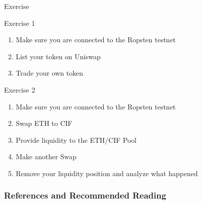 \documentclass[]{beamer}
\begin{document}
\begin{frame}{Exercise}
	\begin{exercise}{Exercise 1}
		\begin{enumerate}
			\item Make sure you are connected to the Ropsten testnet
			\item List your token on Uniswap
			\item Trade your own token
		\end{enumerate}
	\end{exercise}
	
	\begin{exercise}{Exercise 2}
		\begin{enumerate}
			\item Make sure you are connected to the Ropsten testnet
			\item Swap ETH to CIF
			\item Provide liquidity to the ETH/CIF Pool
			\item Make another Swap
			\item Remove your liquidity position and analyze what happened
		\end{enumerate}
	\end{exercise}
\end{frame}



\begin{frame}%
\frametitle{References and Recommended Reading}
\nocite{FS:21}
		
		
	
\end{frame}
\end{document}
